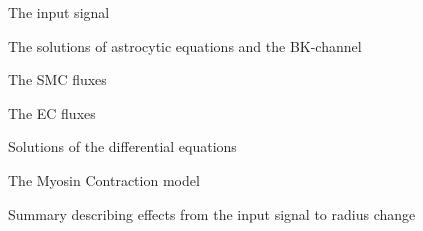 	
	\begin{landscape}
			
		\begin{figure}[h!]
			\centering
			\tiny 
			\setlength\figureheight{3 cm} 
			\setlength\figurewidth{18 cm}
			
			\caption{The input signal}
			\label{fig:1IS}
		\end{figure}
		
		\begin{figure}[h!]
			\centering
			\tiny 
			\setlength\figureheight{3 cm} 
			\setlength\figurewidth{9 cm}
			
			\caption{The solutions of astrocytic equations and the BK-channel}
			\label{fig:7ACe}
		\end{figure}
		
		\begin{figure}[h!]
			\centering
			\tiny 
			\setlength\figureheight{3 cm} 
			\setlength\figurewidth{4.5 cm}
			
			\caption{The SMC fluxes}
			\label{fig:2SMCF}
		\end{figure}
		
		\begin{figure}[h!]
			\centering
			\tiny 
			\setlength\figureheight{3 cm} 
			\setlength\figurewidth{4.5 cm}
			
			\caption{The EC fluxes}
			\label{fig:3ECF}
		\end{figure}
		\begin{figure}[h!]
			\centering
			\tiny  
			\setlength\figureheight{3.5 cm} 
			\setlength\figurewidth{6 cm}
			
			\caption{Solutions of the differential equations}
			\label{fig:4DFDT}
		\end{figure}
		
		\begin{figure}[h!]
			\centering
			\tiny 
			\setlength\figureheight{3 cm} 
			\setlength\figurewidth{9 cm}
			
			\caption{The Myosin Contraction model}
			\label{fig:5MCm}
		\end{figure}
		
		\begin{figure}[h!]
			\centering
			\tiny 
			\setlength\figureheight{3 cm} 
			\setlength\figurewidth{9 cm}
			
			\caption{Summary describing effects from the input signal to radius change}
			\label{fig:6NtR}
		\end{figure}
		
	\end{landscape}
	
